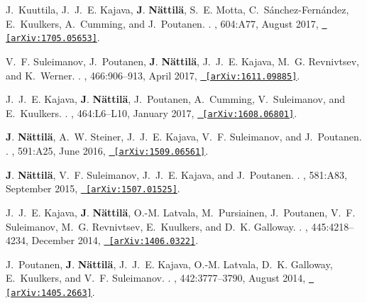 \documentclass[letterpaper, onecolumn, 11pt]{article}
\begin{document}
\begin{thebibliography}{10}
J.~{Kuuttila}, J.~J.~E. {Kajava}, \textbf{J}. \textbf{{N{\"a}ttil{\"a}}}, S.~E.
  {Motta}, C.~{S{\'a}nchez-Fern{\'a}ndez}, E.~{Kuulkers}, A.~{Cumming}, and
  J.~{Poutanen}.
.
\newblock {\em \aap}, 604:A77, August 2017,
  \href{http://arxiv.org/abs/1705.05653}{\nolinkurl{ [arXiv:1705.05653]}}.

V.~F. {Suleimanov}, J.~{Poutanen}, \textbf{J}. \textbf{N{\"a}ttil{\"a}},
  J.~J.~E. {Kajava}, M.~G. {Revnivtsev}, and K.~{Werner}.
.
\newblock {\em \mnras}, 466:906--913, April 2017,
  \href{http://arxiv.org/abs/1611.09885}{\nolinkurl{ [arXiv:1611.09885]}}.

J.~J.~E. {Kajava}, \textbf{J}. \textbf{N{\"a}ttil{\"a}}, J.~{Poutanen},
  A.~{Cumming}, V.~{Suleimanov}, and E.~{Kuulkers}.
.
\newblock {\em \mnras}, 464:L6--L10, January 2017,
  \href{http://arxiv.org/abs/1608.06801}{\nolinkurl{ [arXiv:1608.06801]}}.

\textbf{J}. \textbf{N{\"a}ttil{\"a}}, A.~W. {Steiner}, J.~J.~E. {Kajava}, V.~F.
  {Suleimanov}, and J.~{Poutanen}.
.
\newblock {\em \aap}, 591:A25, June 2016,
  \href{http://arxiv.org/abs/1509.06561}{\nolinkurl{ [arXiv:1509.06561]}}.

\textbf{J}. \textbf{N{\"a}ttil{\"a}}, V.~F. {Suleimanov}, J.~J.~E. {Kajava},
  and J.~{Poutanen}.
.
\newblock {\em \aap}, 581:A83, September 2015,
  \href{http://arxiv.org/abs/1507.01525}{\nolinkurl{ [arXiv:1507.01525]}}.

J.~J.~E. {Kajava}, \textbf{J}. \textbf{N{\"a}ttil{\"a}}, O.-M. {Latvala},
  M.~{Pursiainen}, J.~{Poutanen}, V.~F. {Suleimanov}, M.~G. {Revnivtsev},
  E.~{Kuulkers}, and D.~K. {Galloway}.
.
\newblock {\em \mnras}, 445:4218--4234, December 2014,
  \href{http://arxiv.org/abs/1406.0322}{\nolinkurl{ [arXiv:1406.0322]}}.

J.~{Poutanen}, \textbf{J}. \textbf{N{\"a}ttil{\"a}}, J.~J.~E. {Kajava}, O.-M.
  {Latvala}, D.~K. {Galloway}, E.~{Kuulkers}, and V.~F. {Suleimanov}.
.
\newblock {\em \mnras}, 442:3777--3790, August 2014,
  \href{http://arxiv.org/abs/1405.2663}{\nolinkurl{ [arXiv:1405.2663]}}.

\end{thebibliography}
\end{document}
